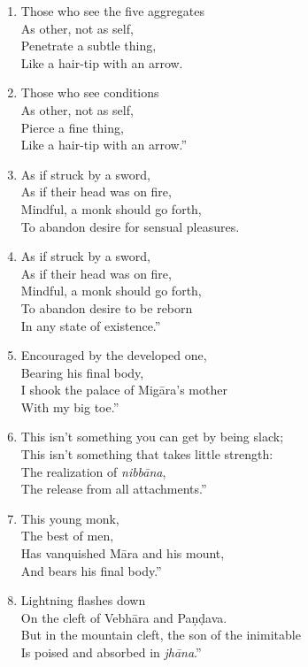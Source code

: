 \documentclass[10pt, openany]{book}
\newcommand*{\vleftofline}[1]{\leavevmode\llap{#1}}
\begin{document}
\begin{enumerate}
\item \vleftofline{“}Those who see the five aggregates\\
As other, not as self,\\
Penetrate a subtle thing,\\
Like a hair-tip with an arrow.

\item Those who see conditions\\
As other, not as self,\\
Pierce a fine thing,\\
Like a hair-tip with an arrow.”

\item \vleftofline{“}As if struck by a sword,\\
As if their head was on fire,\\
Mindful, a monk should go forth,\\
To abandon desire for sensual pleasures.

\item As if struck by a sword,\\
As if their head was on fire,\\
Mindful, a monk should go forth,\\
To abandon desire to be reborn \\
In any state of existence.”

\item \vleftofline{“}Encouraged by the developed one,\\
Bearing his final body,\\
I shook the palace of Migāra’s mother\\
With my big toe.”

\item \vleftofline{“}This isn’t something you can get by being slack;\\
This isn’t something that takes little strength:\\
The realization of \emph{nibbāna},\\
The release from all attachments.”

\item \vleftofline{“}This young monk,\\
The best of men,\\
Has vanquished Māra and his mount,\\
And bears his final body.”

\item \vleftofline{“}Lightning flashes down\\
On the cleft of Vebhāra and Paṇḍava.\\
But in the mountain cleft, the son of the inimitable\\
Is poised and absorbed in \emph{jhāna}.”


\end{enumerate}
\end{document}
